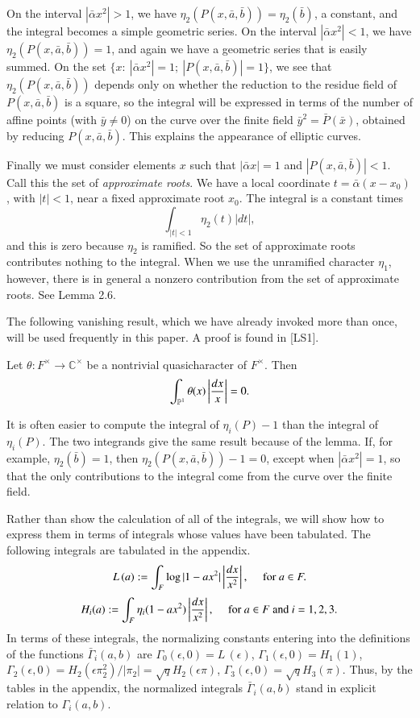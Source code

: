 \documentclass{amsart}
\newcommand\bP{{\mathbb P}}
\newcommand\C{{\mathbb C}}
\newcommand\leftd[1]{\left | {d#1\over #1^2}\right |}
\newcommand\leftdx{\leftd x}
\newcommand\LOG{{L\,}}
\newcommand\bGamma{\bar\Gamma}
\newenvironment{cthm}[1]
  {\renewcommand\thethm{\sc #1}\thm}
  {\endthm}
\begin{document}
On the interval
$|\bar\alpha x^2| >1$, we have $\eta_2(P(x,\bar a,\bar b)) 
        = \eta_2(\bar b)$, a constant,
and the integral becomes a simple geometric series.
On the interval $|\bar\alpha x^2| <1$, we have $\eta_2(P(x,\bar a,\bar b)) = 1$,
and again we have a geometric series that is easily summed.
On the set $\{x: \ |\bar \alpha x^2| = 1; \ |P(x,\bar a,\bar b)| = 1\}$,
we see that $\eta_2(P(x,\bar a,\bar b))$ depends only on whether the
reduction to the residue field of $P(x,\bar a,\bar b)$ is a square,
so the integral will be expressed in
terms of the number of affine
points (with $\bar y\ne 0$) 
on the curve over the finite field $\bar y^2 = \bar P(\bar x)$,
obtained by reducing $P(x,\bar a,\bar b)$.  
This explains the appearance of 
elliptic curves.  

Finally we must consider elements $x$
such that $|\bar \alpha x| = 1$ and $|P(x,\bar a,\bar b)|<1$.
Call this the set of {\it approximate roots}.
We have a local coordinate $t = \bar \alpha(x-x_0)$, with $|t|<1$,
near a fixed approximate root $x_0$.  The integral is a constant times
$$\int_{|t|<1} \eta_2(t)|dt|,$$
and this is zero because $\eta_2$ is ramified.  So the set of
approximate roots contributes nothing to the integral.  When
we use the unramified character $\eta_1$, however, there is in
general a nonzero contribution from the set of approximate roots.
See Lemma 2.6.

The following vanishing result, which we have already invoked
more than once, will be used frequently in this paper.  A proof
is found in [LS1].

\bigskip
\noindent
\begin{cthm}{Lemma 2.2} Let $\theta:F^\times\to \C^\times$ be a
nontrivial quasicharacter of $F^\times$.  Then
$$\int_{\bP^1} \theta(x) \left | {dx\over x}\right | =0.$$
\end{cthm}

It is often easier to compute the integral of $\eta_i(P) - 1$ 
than the integral of $\eta_i(P)$.  The two integrands give the
same result because of the lemma.
If, for example, $\eta_2(\bar b) = 1$, then $\eta_2(P(x,\bar a,\bar b))-1=0$,
except when $|\bar\alpha x^2|=1$, so that the only contributions to the
integral come from the curve over the finite field.

Rather than show the calculation of all of the integrals, we will
show how to express them in terms of integrals whose values
have been tabulated.
The following integrals are tabulated in the appendix.
$$\LOG(a) := \int_{F} \log|1-ax^2| \leftdx,
\quad \text{ for } a\in F.$$
$$H_i(a):= \int_{F}\eta_i(1-ax^2) \leftdx,
\quad \text{ for } a\in F \text{ and } i=1,2,3.$$
In terms of these integrals, the normalizing constants
entering into the definitions of the functions $\bGamma_i(a,b)$
are
$\Gamma_0(\epsilon,0) = \LOG(\epsilon)$, $\Gamma_1(\epsilon,0) = H_1(1)$,
$\Gamma_2(\epsilon,0) = H_2(\epsilon \pi_2^2)/|\pi_2| = \sqrt{q}H_2(\epsilon\pi)$,
$\Gamma_3(\epsilon,0) = \sqrt{q} H_3(\pi)$.  
Thus, by the tables in the appendix,
the normalized integrals $\bGamma_i(a,b)$ stand in explicit relation
to $\Gamma_i(a,b)$.
\end{document}
